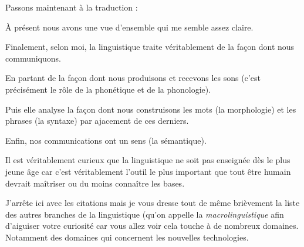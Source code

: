Passons maintenant à la traduction :

\begin{center}
\begin{mdframed}[style=tradstyle, frametitle={\exFR{Traduction} d'un extrait du livre \bs}]
\end{mdframed}  
\end{center}


À présent nous avons une vue d'ensemble qui me semble assez
claire.

Finalement, selon moi, la linguistique traite véritablement de
la façon dont nous communiquons.

En partant de la façon dont nous produisons et recevons les sons
(c'est précisément le rôle de la phonétique et de la phonologie).

Puis elle analyse la façon dont nous construisons les mots (la
morphologie) et les phrases (la syntaxe) par ajacement de ces
derniers.

Enfin, nos communications ont un sens (la sémantique).

Il est véritablement curieux que la linguistique ne soit pas enseignée
dès le plus jeune âge car c'est véritablement l'outil le plus
important que tout être humain devrait maîtriser ou du moins connaître les bases.

J'arrête ici avec les citations mais je vous dresse tout de même
brièvement la liste des autres branches de la linguistique (qu'on
appelle la \emph{macrolinguistique} afin d'aiguiser votre curiosité
car vous allez voir cela touche à de nombreux domaines. Notamment des
domaines qui concernent les nouvelles technologies.

